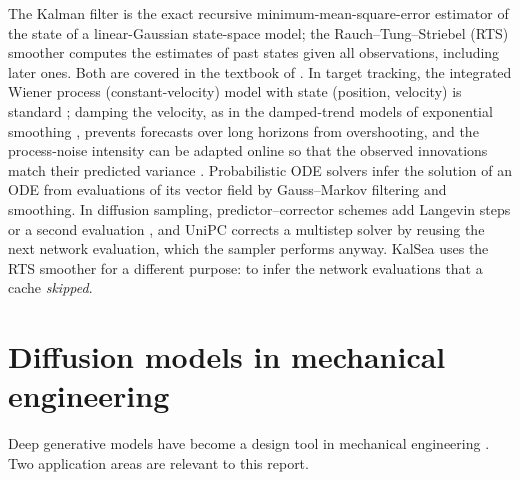The Kalman filter \citep{kalman1960} is the exact recursive minimum-mean-square-error estimator of the state of a linear-Gaussian state-space model; the Rauch--Tung--Striebel (RTS) smoother \citep{rauch1965rts} computes the estimates of past states given all observations, including later ones. Both are covered in the textbook of \citet{sarkka2013bayesian}. In target tracking, the integrated Wiener process (constant-velocity) model with state (position, velocity) is standard \citep{barshalom2001estimation}; damping the velocity, as in the damped-trend models of exponential smoothing \citep{gardner1985damped}, prevents forecasts over long horizons from overshooting, and the process-noise intensity can be adapted online so that the observed innovations match their predicted variance \citep{mehra1972adaptive}. Probabilistic ODE solvers \citep{schober2019probabilistic,tronarp2019probabilistic} infer the solution of an ODE from evaluations of its vector field by Gauss--Markov filtering and smoothing. In diffusion sampling, predictor--corrector schemes add Langevin steps \citep{song2021sde} or a second evaluation \citep{karras2022edm}, and UniPC \citep{zhao2023unipc} corrects a multistep solver by reusing the next network evaluation, which the sampler performs anyway. KalSea uses the RTS smoother for a different purpose: to infer the network evaluations that a cache \emph{skipped}.

\section{Diffusion models in mechanical engineering}\label{sec:lit-mech}

Deep generative models have become a design tool in mechanical engineering \citep{regenwetter2022deep}. Two application areas are relevant to this report.

